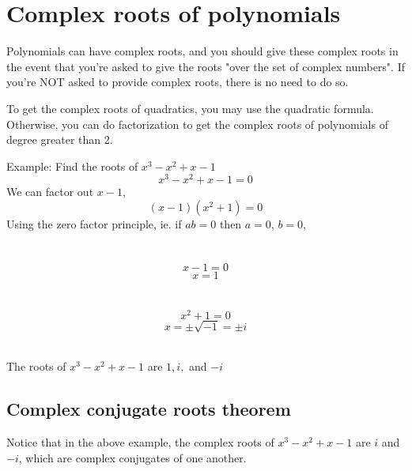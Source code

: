 \documentclass{article}
\begin{document}
\section{Complex roots of polynomials}

Polynomials can have complex roots, and you should give these complex roots in the event that you're asked to give the roots "over the set of complex numbers". If you're NOT asked to provide complex roots, there is no need to do so.

\vspace{\baselineskip}

\noindent To get the complex roots of quadratics, you may use the quadratic formula. Otherwise, you can do factorization to get the complex roots of polynomials of degree greater than 2.

\begin{center}
    Example: Find the roots of $x^3-x^2+x-1$
    $$ x^3-x^2+x-1=0 $$
    We can factor out $x-1$,
    $$ (x-1)(x^2+1) = 0$$
    Using the zero factor principle, ie. if $ab=0$ then $a=0$, $b=0$,
    \begin{multicols}{2}
        \section*{}
        \vspace{-\baselineskip} %
        $$x-1=0$$
        $$x=1$$
    
        \section*{}
        \vspace{-\baselineskip} %
        $$x^2+1=0$$
        $$x=\pm\sqrt{-1}=\pm i$$
    \end{multicols}
    \noindent {} \\
    \vspace{\baselineskip}
    The roots of $x^3-x^2+x-1$ are $1, i,$ and $-i$
\end{center}

\subsection{Complex conjugate roots theorem}
Notice that in the above example, the complex roots of $x^3-x^2+x-1$ are $i$ and $-i$, which are complex conjugates of one another.

\begin{center}
    \noindent {}
\end{center}
\end{document}
